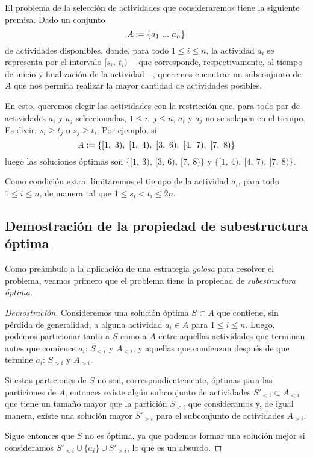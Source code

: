 \vspace{1em}
El problema de la selección de actividades que consideraremos tiene la siguiente premisa. Dado un conjunto 
\begin{equation}\\\nonumber
    A := \{a_1\ ...\ a_n \}
\end{equation}
de actividades disponibles, donde, para todo $1 \leq i \leq n$, la actividad $a_i$ se representa por el intervalo $[s_i,\ t_i)$ ---que corresponde, respectivamente, al tiempo de inicio y finalización de la actividad---,  queremos encontrar un subconjunto de $A$ que nos permita realizar la mayor cantidad de actividades posibles. 

En esto, queremos elegir las actividades con la restricción que, para todo par de actividades $a_i$ y $a_j$ seleccionadas, $1 \leq i,\ j \leq n$, $a_i$ y $a_j$ no se solapen en el tiempo. Es decir, $s_i \geq t_j$ o $s_j \geq t_i$. Por ejemplo, si
\begin{equation}\\\nonumber
    A := \{[1,\ 3),\ [1,\ 4),\ [3,\ 6),\ [4,\ 7),\ [7,\ 8)\}
\end{equation}
\noindent luego las soluciones óptimas son $\{[1,\ 3),\ [3,\ 6),\ [7,\ 8)\}$ y $\{[1,\ 4),\ [4,\ 7),\ [7,\ 8)\}$. 

Como condición extra, limitaremos el tiempo de la actividad $a_i$, para todo $1 \leq i \leq n$, de manera tal que $1 \leq s_i < t_i \leq 2n$. 

\subsection{Demostración de la propiedad de subestructura óptima}

Como preámbulo a la aplicación de una estrategia \textit{golosa} para resolver el problema, veamos primero que el problema tiene la propiedad de \textit{subestructura óptima}. 

\begin{proof}[Demostración]
    Consideremos una solución óptima $S \subset A$ que contiene, sin pérdida de generalidad, a alguna actividad $a_i \in A$ para $1 \leq i \leq n$. Luego, podemos particionar tanto a $S$ como a $A$ entre aquellas actividades que terminan antes que comience $a_i$: $S_{<i}$ y $A_{<i}$; y aquellas que comienzan después de que termine $a_i$: $S_{>i}$ y $A_{>i}$. 

    Si estas particiones de $S$ no son, correspondientemente, óptimas para las particiones de $A$, entonces existe algún subconjunto de actividades $S'_{<i} \subset A_{<i}$ que tiene un tamaño mayor que la partición $S_{<i}$ que consideramos y, de igual manera, existe una solución mayor $S'_{>i}$ para el subconjunto de actividades $A_{>i}$.
    
    Sigue entonces que $S$ no es óptima, ya que podemos formar una solución mejor si consideramos $S'_{<i} \cup \{a_i\} \cup S'_{>i}$, lo que es un absurdo.
\end{proof}


